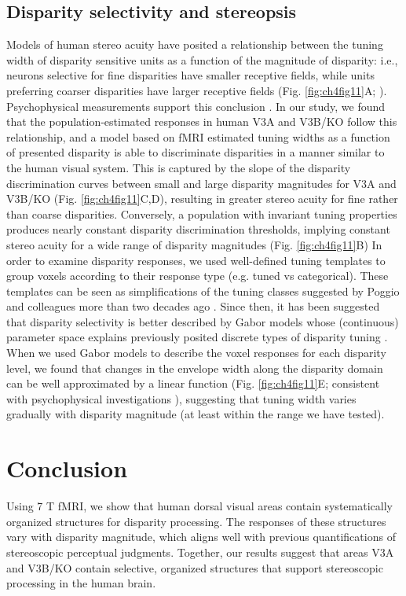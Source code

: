 \subsection{Disparity selectivity and stereopsis}
Models of human stereo acuity have posited a relationship between the tuning width of disparity sensitive units as a function of the magnitude of disparity: i.e., neurons selective for fine disparities have smaller receptive fields, while units preferring coarser disparities have larger receptive fields (Fig. \ref{fig:ch4fig11}A; \cite{Lehky:1990fk}). Psychophysical measurements support this conclusion \cite{Stevenson:1992kx}. In our study, we found that the population-estimated responses in human V3A and V3B/KO follow this relationship, and a model based on fMRI estimated tuning widths as a function of presented disparity is able to discriminate disparities in a manner similar to the human visual system. This is captured by the slope of the disparity discrimination curves between small and large disparity magnitudes for V3A and V3B/KO (Fig. \ref{fig:ch4fig11}C,D), resulting in greater stereo acuity for fine rather than coarse disparities. Conversely, a population with invariant tuning properties produces nearly constant disparity discrimination thresholds, implying constant stereo acuity for a wide range of disparity magnitudes (Fig. \ref{fig:ch4fig11}B)
In order to examine disparity responses, we used well-defined tuning templates to group voxels according to their response type (e.g. tuned vs categorical). These templates can be seen as simplifications of the tuning classes suggested by Poggio and colleagues more than two decades ago \cite{Poggio:1988ij}. Since then, it has been suggested that disparity selectivity is better described by Gabor models whose (continuous) parameter space explains previously posited discrete types of disparity tuning \cite{Prince:2002uq}. When we used Gabor models to describe the voxel responses for each disparity level, we found that changes in the envelope width along the disparity domain can be well approximated by a linear function (Fig. \ref{fig:ch4fig11}E; consistent with psychophysical investigations \cite{Stevenson:1992kx}), suggesting that tuning width varies gradually with disparity magnitude (at least within the range we have tested). 

\section{Conclusion}
Using 7 T fMRI, we show that human dorsal visual areas contain systematically organized structures for disparity processing. The responses of these structures vary with disparity magnitude, which aligns well with previous quantifications of stereoscopic perceptual judgments. Together, our results suggest that areas V3A and V3B/KO contain selective, organized structures that support stereoscopic processing in the human brain.


